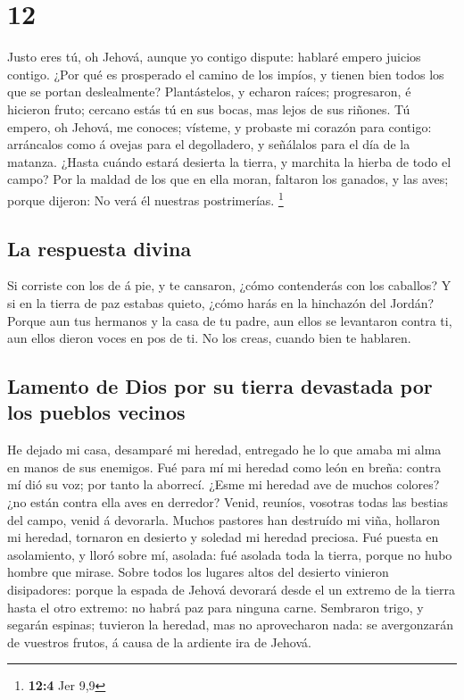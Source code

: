 \hypertarget{section-11}{%
\section{12}\label{section-11}}

 Justo eres tú, oh Jehová, aunque yo contigo dispute:
hablaré empero juicios contigo. ¿Por qué es prosperado el camino de los
impíos, y tienen bien todos los que se portan deslealmente? 
Plantástelos, y echaron raíces; progresaron, é hicieron fruto; cercano
estás tú en sus bocas, mas lejos de sus riñones.  Tú empero,
oh Jehová, me conoces; vísteme, y probaste mi corazón para contigo:
arráncalos como á ovejas para el degolladero, y señálalos para el día de
la matanza.  ¿Hasta cuándo estará desierta la tierra, y
marchita la hierba de todo el campo? Por la maldad de los que en ella
moran, faltaron los ganados, y las aves; porque dijeron: No verá él
nuestras postrimerías. \footnote{\textbf{12:4} Jer 9,9}

\hypertarget{la-respuesta-divina}{%
\subsection{La respuesta divina}\label{la-respuesta-divina}}

 Si corriste con los de á pie, y te cansaron, ¿cómo
contenderás con los caballos? Y si en la tierra de paz estabas quieto,
¿cómo harás en la hinchazón del Jordán?  Porque aun tus
hermanos y la casa de tu padre, aun ellos se levantaron contra ti, aun
ellos dieron voces en pos de ti. No los creas, cuando bien te hablaren.

\hypertarget{lamento-de-dios-por-su-tierra-devastada-por-los-pueblos-vecinos}{%
\subsection{Lamento de Dios por su tierra devastada por los pueblos
vecinos}\label{lamento-de-dios-por-su-tierra-devastada-por-los-pueblos-vecinos}}

 He dejado mi casa, desamparé mi heredad, entregado he lo
que amaba mi alma en manos de sus enemigos.  Fué para mí mi
heredad como león en breña: contra mí dió su voz; por tanto la aborrecí.
 ¿Esme mi heredad ave de muchos colores? ¿no están contra
ella aves en derredor? Venid, reuníos, vosotras todas las bestias del
campo, venid á devorarla.  Muchos pastores han destruído mi
viña, hollaron mi heredad, tornaron en desierto y soledad mi heredad
preciosa.  Fué puesta en asolamiento, y lloró sobre mí,
asolada: fué asolada toda la tierra, porque no hubo hombre que mirase.
 Sobre todos los lugares altos del desierto vinieron
disipadores: porque la espada de Jehová devorará desde el un extremo de
la tierra hasta el otro extremo: no habrá paz para ninguna carne.
 Sembraron trigo, y segarán espinas; tuvieron la heredad,
mas no aprovecharon nada: se avergonzarán de vuestros frutos, á causa de
la ardiente ira de Jehová.


